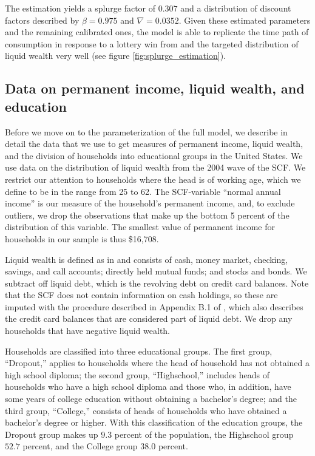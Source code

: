\documentclass[\econtexRoot/HAFiscal]{subfiles}
\begin{document}
The estimation yields a splurge factor of $0.307$ and a distribution of discount factors described by $\beta = 0.975$ and $\nabla=0.0352$. Given these estimated parameters and the remaining calibrated ones, the model is able to replicate the time path of consumption in response to a lottery win from \citet{fagereng_mpc_2021} and the targeted distribution of liquid wealth very well (see figure \ref{fig:splurge_estimation}).

\hypertarget{data-on-permanent-income-liquid-wealth-and-education}{}\par\subsection{Data on permanent income, liquid wealth, and education}
\notinsubfile{\label{sec:SCFdata}}

Before we move on to the parameterization of the full model, we describe in detail the data that we use to get measures of permanent income, liquid wealth, and the division of households into educational groups in the United States. We use data on the distribution of liquid wealth from the 2004 wave of the SCF. We restrict our attention to households where the head is of working age, which we define to be in the range from 25 to 62. The SCF-variable ``normal annual income'' is our measure of the household's permanent income, and, to exclude outliers, we drop the observations that make up the bottom 5 percent of the distribution of this variable. The smallest value of permanent income for households in our sample is thus \$16,708. 

Liquid wealth is defined as in \cite{kaplan2014model} and consists of cash, money market, checking, savings, and call accounts; directly held mutual funds; and stocks and bonds. We subtract off liquid debt, which is the revolving debt on credit card balances. Note that the SCF does not contain information on cash holdings, so these are imputed with the procedure described in Appendix B.1 of \cite{kaplan2014model}, which also describes the credit card balances that are considered part of liquid debt. We drop any households that have negative liquid wealth. 

Households are classified into three educational groups. The first group, ``Dropout,'' applies to households where the head of household has not obtained a high school diploma; the second group, ``Highschool,'' includes heads of households who have a high school diploma and those who, in addition, have some years of college education without obtaining a bachelor's degree; and the third group, ``College,'' consists of heads of households who have obtained a bachelor's degree or higher. With this classification of the education groups, the Dropout group makes up $9.3$ percent of the population, the Highschool group $52.7$ percent, and the College group $38.0$ percent. 
\end{document}
